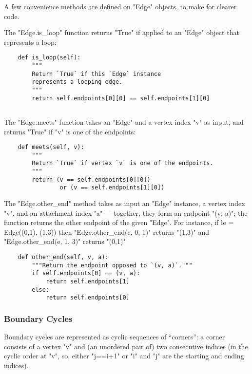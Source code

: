 A few convenience methods are defined on "Edge" objects, to make for
clearer code.

The "Edge.is_loop" function returns "True" if applied to an
"Edge" object that represents a loop:
\begin{lstlisting}
    def is_loop(self):
        """
        Return `True` if this `Edge` instance 
        represents a looping edge.
        """
        return self.endpoints[0][0] == self.endpoints[1][0]
        
\end{lstlisting}

The "Edge.meets" function takes an "Edge" and a vertex index "v"
as input, and returns "True" if "v" is one of the endpoints:
\begin{lstlisting}
    def meets(self, v):
        """
        Return `True` if vertex `v` is one of the endpoints.
        """
        return (v == self.endpoints[0][0]) 
                or (v == self.endpoints[1][0])

\end{lstlisting}

The "Edge.other_end" method takes as input an "Edge" instance, a
vertex index "v", and an attachment index "a" --- together, they
form an endpoint "(v, a)"; the function returns the other endpoint
of the given "Edge".  For instance, if \l{e = Edge((0,1), (1,3))}
then "Edge.other_end(e, 0, 1)" returns "(1,3)" and
"Edge.other_end(e, 1, 3)" returns "(0,1)"
\begin{lstlisting}
    def other_end(self, v, a):
        """Return the endpoint opposed to `(v, a)`."""
        if self.endpoints[0] == (v, a):
            return self.endpoints[1]
        else:
            return self.endpoints[0]

\end{lstlisting}


\subsubsection{Boundary Cycles}
\label{sec:boundary-cycles}

Boundary cycles are represented as cyclic sequences of ``corners'': a
corner consists of a vertex "v" and (an unordered pair of) two
consecutive indices (in the cyclic order at "v", so, either
"j==i+1" or "i" and "j" are the starting and ending indices).

